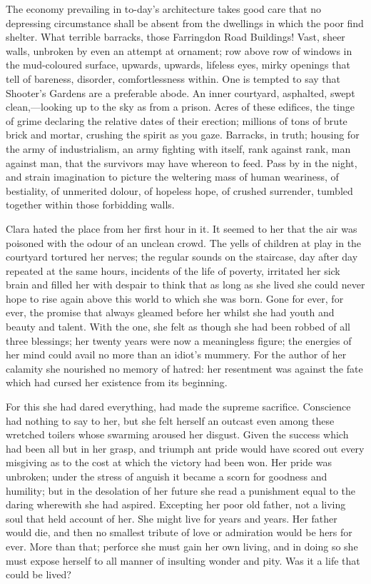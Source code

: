The economy prevailing in to-day's architecture takes good care that no
depressing circumstance shall be absent from the dwellings in which the
poor find shelter. What terrible barracks, those Farringdon Road
Buildings! Vast, sheer walls, unbroken by even an attempt at ornament;
row above row of windows in the mud-coloured surface, upwards, upwards,
lifeless eyes, mirky openings that tell of bareness, disorder,
comfortlessness within. One is tempted to say that Shooter's Gardens are
a preferable abode. An inner courtyard, asphalted, swept
clean,---looking up to the sky as from a prison. Acres of these
edifices, the tinge of grime declaring the relative dates of their
erection; millions of tons of brute brick and mortar, crushing the
spirit as you gaze. Barracks, in truth; housing for the army of
industrialism, an army fighting with itself, rank against rank, man
against man, that the survivors may have {}whereon to feed. Pass by in
the night, and strain imagination to picture the weltering mass of human
weariness, of bestiality, of unmerited dolour, of hopeless hope, of
crushed surrender, tumbled together within those forbidding walls.

Clara hated the place from her first hour in it. It seemed to her that
the air was poisoned with the odour of an unclean crowd. The yells of
children at play in the courtyard tortured her nerves; the regular
sounds on the staircase, day after day repeated at the same hours,
incidents of the life of poverty, irritated her sick brain and filled
her with despair to think that as long as she lived she could never hope
to rise again above this world to which she was born. Gone for ever, for
ever, the promise that always gleamed before her whilst she had youth
and beauty and talent. With the one, she felt as though she had been
robbed of all three blessings; her twenty years were now a meaningless
figure; the energies of her mind could avail no more than an idiot's
mummery. For the author of her calamity she nourished no memory of
hatred: her resentment was {}against the fate which had cursed her
existence from its beginning.

For this she had dared everything, had made the supreme sacrifice.
Conscience had nothing to say to her, but she felt herself an outcast
even among these wretched toilers whose swarming aroused her disgust.
Given the success which had been all but in her grasp, and triumph ant
pride would have scored out every misgiving as to the cost at which the
victory had been won. Her pride was unbroken; under the stress of
anguish it became a scorn for goodness and humility; but in the
desolation of her future she read a punishment equal to the daring
wherewith she had aspired. Excepting her poor old father, not a living
soul that held account of her. She might live for years and years. Her
father would die, and then no smallest tribute of love or admiration
would be hers for ever. More than that; perforce she must gain her own
living, and in doing so she must expose herself to all manner of
insulting wonder and pity. Was it a life that could be lived?


